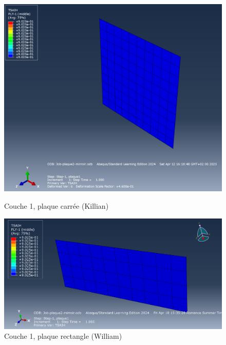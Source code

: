 \documentclass[a4paper,12pt]{article}
\begin{document}
\begin{figure}[H]
	\centering
	\begin{minipage}[t][0.3\textheight]{0.495\textwidth}
		\centering
		\includegraphics[width=\textwidth]{media/K_P2_L1-8_12042025.png} %
		\caption{Couche 1, plaque carrée (Killian)}
		\label{fig:image1}
	\end{minipage}
	\hfill
	\begin{minipage}[t][0.3\textheight]{0.495\textwidth}
		\centering
		\includegraphics[width=\textwidth]{media/Couche1_Mirroir.png} %
		\caption{Couche 1, plaque rectangle (William)}
		\label{fig:image2}
	\end{minipage}
\end{figure}
\end{document}
